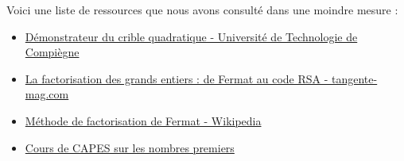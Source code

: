 \documentclass[11pt,a4paper]{article}
\begin{document}
	Voici une liste de ressources que nous avons consulté dans une moindre mesure : 
	\begin{itemize}
		\item \href{https://www.utc.fr/~wschon/sr06/UtCrible/UtCrible.html#about}{Démonstrateur du crible quadratique - Université de Technologie de Compiègne}
		\item \href{https://www.tangente-mag.com/article.php?id=7059}{La factorisation des grands entiers : de Fermat au code RSA - tangente-mag.com}
		\item \href{https://fr.wikipedia.org/wiki/M%C3%A9thode_de_factorisation_de_Fermat}{Méthode de factorisation de Fermat - Wikipedia}	
		\item\href{https://www.capes-de-maths.com/lecons/lecon13.pdf}{Cours de CAPES sur les nombres premiers}
	\end{itemize}
	
	
	
\end{document}

